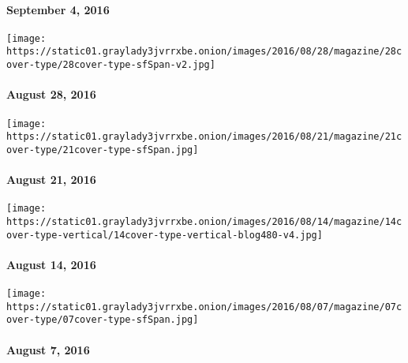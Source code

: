 \hypertarget{september-4-2016}{%
\paragraph{September 4, 2016}\label{september-4-2016}}

\href{http://www.nytimes3xbfgragh.onion/indexes/2016/08/28/magazine/index.html}{}

\texttt{[image: https://static01.graylady3jvrrxbe.onion/images/2016/08/28/magazine/28cover-type/28cover-type-sfSpan-v2.jpg]}

\hypertarget{august-28-2016}{%
\paragraph{August 28, 2016}\label{august-28-2016}}

\href{http://www.nytimes3xbfgragh.onion/indexes/2016/08/21/magazine/index.html}{}

\texttt{[image: https://static01.graylady3jvrrxbe.onion/images/2016/08/21/magazine/21cover-type/21cover-type-sfSpan.jpg]}

\hypertarget{august-21-2016}{%
\paragraph{August 21, 2016}\label{august-21-2016}}

\href{http://www.nytimes3xbfgragh.onion/indexes/2016/08/14/magazine/index.html}{}

\texttt{[image: https://static01.graylady3jvrrxbe.onion/images/2016/08/14/magazine/14cover-type-vertical/14cover-type-vertical-blog480-v4.jpg]}

\hypertarget{august-14-2016}{%
\paragraph{August 14, 2016}\label{august-14-2016}}

\href{http://www.nytimes3xbfgragh.onion/indexes/2016/08/07/magazine/index.html}{}

\texttt{[image: https://static01.graylady3jvrrxbe.onion/images/2016/08/07/magazine/07cover-type/07cover-type-sfSpan.jpg]}

\hypertarget{august-7-2016}{%
\paragraph{August 7, 2016}\label{august-7-2016}}

\href{http://www.nytimes3xbfgragh.onion/indexes/2016/07/31/magazine/index.html}{}

